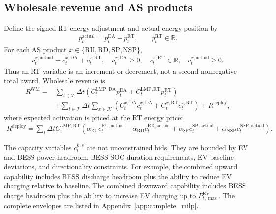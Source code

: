 \documentclass[final,5p,times]{elsarticle}
\newcommand{\DeltaT}{\Delta t}
\newcommand{\EV}{\mathrm{EV}}
\newcommand{\DA}{\mathrm{DA}}
\newcommand{\RT}{\mathrm{RT}}
\newcommand{\RU}{\mathrm{RU}}
\newcommand{\RD}{\mathrm{RD}}
\newcommand{\SP}{\mathrm{SP}}
\newcommand{\NSP}{\mathrm{NSP}}
\newcommand{\WM}{\mathrm{WM}}
\newcommand{\calT}{\mathcal{T}}
\newcommand{\calK}{\mathcal{K}}
\begin{document}
\subsection{Wholesale revenue and AS products}
Define the signed RT energy adjustment and actual energy position by
\begin{align}
p_t^{\mathrm{actual}}=p_t^{\DA}+p_t^{\RT},\qquad p_t^{\RT}\in\mathbb{R}.
\label{eq:pactual_main}
\end{align}
For each AS product $x\in\{\RU,\RD,\SP,\NSP\}$,
\begin{align}
c_t^{x,\mathrm{actual}}=c_t^{x,\DA}+c_t^{x,\RT},\quad
c_t^{x,\DA}\ge0,\quad c_t^{x,\RT}\in\mathbb{R},\quad c_t^{x,\mathrm{actual}}\ge0.
\label{eq:cactual_main}
\end{align}
Thus an RT variable is an increment or decrement, not a second nonnegative total award. Wholesale revenue is
\begin{align}
R^{\WM}=&\sum_{t\in\calT}\DeltaT\left(C_t^{\mathrm{LMP},\DA}p_t^{\DA}+C_t^{\mathrm{LMP},\RT}p_t^{\RT}\right)\nonumber\\
&+\sum_{t\in\calT}\DeltaT\sum_{x\in\calK}
\left(C_t^{x,\DA}c_t^{x,\DA}+C_t^{x,\RT}c_t^{x,\RT}\right)+R^{\mathrm{deploy}},
\label{eq:wm_revenue_main}
\end{align}
where expected activation is priced at the RT energy price:
\begin{align}
R^{\mathrm{deploy}}=\sum_t\DeltaT C_t^{\mathrm{LMP},\RT}
\left(\alpha_{\RU}c_t^{\RU,\mathrm{actual}}-\alpha_{\RD}c_t^{\RD,\mathrm{actual}}+\alpha_{\SP}c_t^{\SP,\mathrm{actual}}+\alpha_{\NSP}c_t^{\NSP,\mathrm{actual}}\right).
\label{eq:deployment_revenue_main}
\end{align}

The capacity variables $c_t^{k,s}$ are not unconstrained bids. They are bounded by EV and BESS power headroom, BESS SOC duration requirements, EV baseline deviations, and directionality constraints. For example, the combined upward capability includes BESS discharge headroom plus the ability to reduce EV charging relative to baseline. The combined downward capability includes BESS charge headroom plus the ability to increase EV charging up to $P_{t,\max}^{\EV}$. The complete envelopes are listed in Appendix~\ref{app:complete_milp}.
\end{document}
